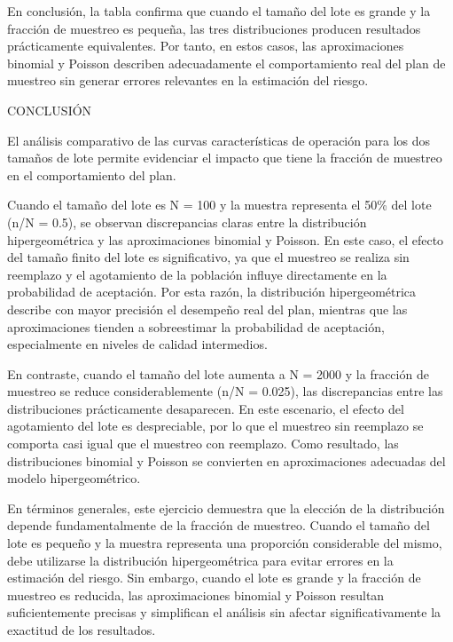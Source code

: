 \documentclass[
  12pt,
]{article}
\begin{document}
En conclusión, la tabla confirma que cuando el tamaño del lote es grande
y la fracción de muestreo es pequeña, las tres distribuciones producen
resultados prácticamente equivalentes. Por tanto, en estos casos, las
aproximaciones binomial y Poisson describen adecuadamente el
comportamiento real del plan de muestreo sin generar errores relevantes
en la estimación del riesgo.

CONCLUSIÓN

El análisis comparativo de las curvas características de operación para
los dos tamaños de lote permite evidenciar el impacto que tiene la
fracción de muestreo en el comportamiento del plan.

Cuando el tamaño del lote es N = 100 y la muestra representa el 50\% del
lote (n/N = 0.5), se observan discrepancias claras entre la distribución
hipergeométrica y las aproximaciones binomial y Poisson. En este caso,
el efecto del tamaño finito del lote es significativo, ya que el
muestreo se realiza sin reemplazo y el agotamiento de la población
influye directamente en la probabilidad de aceptación. Por esta razón,
la distribución hipergeométrica describe con mayor precisión el
desempeño real del plan, mientras que las aproximaciones tienden a
sobreestimar la probabilidad de aceptación, especialmente en niveles de
calidad intermedios.

En contraste, cuando el tamaño del lote aumenta a N = 2000 y la fracción
de muestreo se reduce considerablemente (n/N = 0.025), las discrepancias
entre las distribuciones prácticamente desaparecen. En este escenario,
el efecto del agotamiento del lote es despreciable, por lo que el
muestreo sin reemplazo se comporta casi igual que el muestreo con
reemplazo. Como resultado, las distribuciones binomial y Poisson se
convierten en aproximaciones adecuadas del modelo hipergeométrico.

En términos generales, este ejercicio demuestra que la elección de la
distribución depende fundamentalmente de la fracción de muestreo. Cuando
el tamaño del lote es pequeño y la muestra representa una proporción
considerable del mismo, debe utilizarse la distribución hipergeométrica
para evitar errores en la estimación del riesgo. Sin embargo, cuando el
lote es grande y la fracción de muestreo es reducida, las aproximaciones
binomial y Poisson resultan suficientemente precisas y simplifican el
análisis sin afectar significativamente la exactitud de los resultados.
\end{document}
